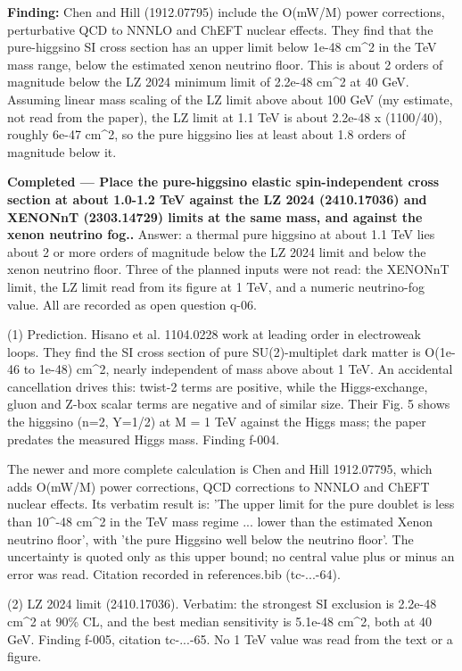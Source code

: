 \documentclass[11pt,a4paper]{article}
\begin{document}
\textbf{Finding:} Chen and Hill (1912.07795) include the O(mW/M) power corrections, perturbative QCD to NNNLO and ChEFT nuclear effects. They find that the pure-higgsino SI cross section has an upper limit below 1e-48 cm\textasciicircum{}2 in the TeV mass range, below the estimated xenon neutrino floor. This is about 2 orders of magnitude below the LZ 2024 minimum limit of 2.2e-48 cm\textasciicircum{}2 at 40 GeV. Assuming linear mass scaling of the LZ limit above about 100 GeV (my estimate, not read from the paper), the LZ limit at 1.1 TeV is about 2.2e-48 x (1100/40), roughly 6e-47 cm\textasciicircum{}2, so the pure higgsino lies at least about 1.8 orders of magnitude below it.

\textbf{Completed --- Place the pure-higgsino elastic spin-independent cross section at about 1.0-1.2 TeV against the LZ 2024 (2410.17036) and XENONnT (2303.14729) limits at the same mass, and against the xenon neutrino fog..} Answer: a thermal pure higgsino at about 1.1 TeV lies about 2 or more orders of magnitude below the LZ 2024 limit and below the xenon neutrino floor. Three of the planned inputs were not read: the XENONnT limit, the LZ limit read from its figure at 1 TeV, and a numeric neutrino-fog value. All are recorded as open question q-06.

(1) Prediction. Hisano et al. 1104.0228 work at leading order in electroweak loops. They find the SI cross section of pure SU(2)-multiplet dark matter is O(1e-46 to 1e-48) cm\textasciicircum{}2, nearly independent of mass above about 1 TeV. An accidental cancellation drives this: twist-2 terms are positive, while the Higgs-exchange, gluon and Z-box scalar terms are negative and of similar size. Their Fig. 5 shows the higgsino (n=2, Y=1/2) at M = 1 TeV against the Higgs mass; the paper predates the measured Higgs mass. Finding f-004.

The newer and more complete calculation is Chen and Hill 1912.07795, which adds O(mW/M) power corrections, QCD corrections to NNNLO and ChEFT nuclear effects. Its verbatim result is: 'The upper limit for the pure doublet is less than 10\textasciicircum{}-48 cm\textasciicircum{}2 in the TeV mass regime ... lower than the estimated Xenon neutrino floor', with 'the pure Higgsino well below the neutrino floor'. The uncertainty is quoted only as this upper bound; no central value plus or minus an error was read. Citation recorded in references.bib (tc-...-64).

(2) LZ 2024 limit (2410.17036). Verbatim: the strongest SI exclusion is 2.2e-48 cm\textasciicircum{}2 at 90\% CL, and the best median sensitivity is 5.1e-48 cm\textasciicircum{}2, both at 40 GeV. Finding f-005, citation tc-...-65. No 1 TeV value was read from the text or a figure.
\end{document}
